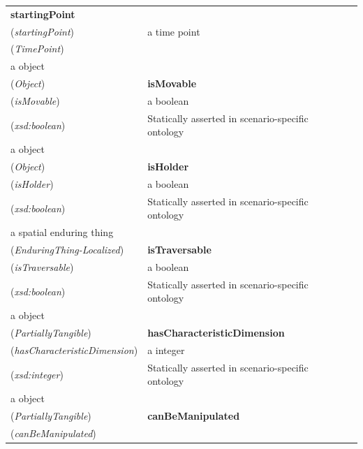 \documentclass{svmult}
\begin{document}
\begin{table}[h]
\begin{tabular}{p{3cm}p{6cm}p{3cm}l}
\textbf{startingPoint}
\\ (\emph{startingPoint})  & 

 a time point
\\ (\emph{TimePoint})  & 

 \\ 


 a object
\\ (\emph{Object})  & 

\textbf{isMovable}
\\ (\emph{isMovable})  & 

 a boolean
\\ (\emph{xsd:boolean})  & 

Statically asserted in scenario-specific ontology  \\ 


 a object
\\ (\emph{Object})  & 

\textbf{isHolder}
\\ (\emph{isHolder})  & 

 a boolean
\\ (\emph{xsd:boolean})  & 

Statically asserted in scenario-specific ontology  \\ 


 a spatial enduring thing
\\ (\emph{EnduringThing-Localized})  & 

\textbf{isTraversable}
\\ (\emph{isTraversable})  & 

 a boolean
\\ (\emph{xsd:boolean})  & 

Statically asserted in scenario-specific ontology  \\ 


 a object
\\ (\emph{PartiallyTangible})  & 

\textbf{hasCharacteristicDimension}
\\ (\emph{hasCharacteristicDimension})  & 

 a integer
\\ (\emph{xsd:integer})  & 

Statically asserted in scenario-specific ontology  \\ 


 a object
\\ (\emph{PartiallyTangible})  & 

\textbf{canBeManipulated}
\\ (\emph{canBeManipulated})  & 


\end{tabular}
\end{table}
\end{document}
